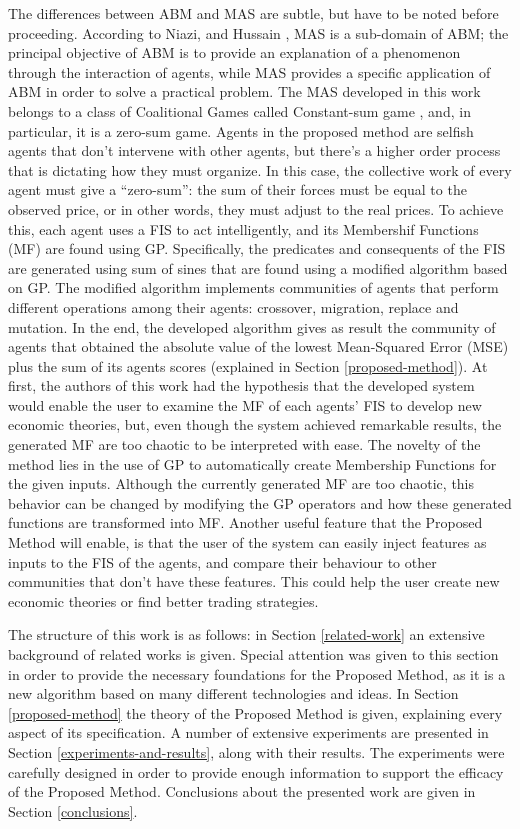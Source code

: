 \documentclass[12pt,journal,draftcls,onecolumn]{IEEEtran}
\begin{document}
The differences between ABM and MAS are subtle, but have to be noted
before proceeding. According to Niazi, and Hussain \cite{Niazi2011},
MAS is a sub-domain of ABM; the principal objective of ABM is to
provide an explanation of a phenomenon through the interaction of
agents, while MAS provides a specific application of ABM in order to
solve a practical problem. The MAS developed in this work belongs to a
class of Coalitional Games called Constant-sum game \cite{Shoham2009},
and, in particular, it is a zero-sum game. Agents in the proposed
method are selfish agents that don't intervene with other agents, but
there's a higher order process that is dictating how they must
organize. In this case, the collective work of every agent must give a
``zero-sum'': the sum of their forces must be equal to the observed
price, or in other words, they must adjust to the real prices. To
achieve this, each agent uses a FIS to act intelligently, and its
Membershif Functions (MF) are found using GP. Specifically, the
predicates and consequents of the FIS are generated using sum of sines
that are found using a modified algorithm based on GP. The modified
algorithm implements communities of agents that perform different
operations among their agents: crossover, migration, replace and
mutation. In the end, the developed algorithm gives as result the
community of agents that obtained the absolute value of the lowest
Mean-Squared Error (MSE) plus the sum of its agents scores (explained
in Section \ref{proposed-method}). At first, the authors of this work
had the hypothesis that the developed system would enable the user to
examine the MF of each agents' FIS to develop new economic theories,
but, even though the system achieved remarkable results, the generated
MF are too chaotic to be interpreted with ease. The novelty of the
method lies in the use of GP to automatically create Membership
Functions for the given inputs. Although the currently generated MF
are too chaotic, this behavior can be changed by modifying the GP
operators and how these generated functions are transformed into
MF. Another useful feature that the Proposed Method will enable, is
that the user of the system can easily inject features as inputs to
the FIS of the agents, and compare their behaviour to other
communities that don't have these features. This could help the user
create new economic theories or find better trading strategies.


The structure of this work is as follows: in Section \ref{related-work} an extensive background of related works is given. Special attention was given to this section in order to provide the necessary foundations for the Proposed Method, as it is a new algorithm based on many different technologies and ideas. In Section \ref{proposed-method} the theory of the Proposed Method is given, explaining every aspect of its specification. A number of extensive experiments are presented in Section \ref{experiments-and-results}, along with their results. The experiments were carefully designed in order to provide enough information to support the efficacy of the Proposed Method. Conclusions about the presented work are given in Section \ref{conclusions}.
  
\end{document}
